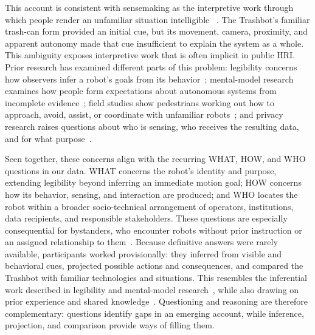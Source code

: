 This account is consistent with sensemaking as the interpretive work through
which people render an unfamiliar situation intelligible
~\cite{weick2005organizing}.  The Trashbot's familiar trash-can form provided an initial cue, but its movement, camera, proximity, and apparent autonomy made that cue insufficient to explain the system as a whole. This ambiguity exposes interpretive work that is often implicit in public HRI. Prior research has examined different parts of this problem: legibility concerns how observers infer a robot's goals from its behavior~\cite{dragan2013legibility}; mental-model research examines how people form expectations about autonomous systems from incomplete evidence~\cite{paepcke2010judging,riek2012wizard}; field studies show pedestrians working out how to approach, avoid, assist, or coordinate with unfamiliar robots~\cite{pelikan2024encountering,dobrosovestnova2022little,weinberg2023sharing}; and privacy research raises questions about who is sensing, who receives the resulting data, and for what purpose~\cite{denning2014insitu,dietrich2026bystander}.

Seen together, these concerns align with the recurring WHAT, HOW, and WHO questions in our data. WHAT concerns the robot's identity and purpose, extending legibility beyond inferring an immediate motion goal; HOW concerns how its behavior, sensing, and interaction are produced; and WHO locates the robot within a broader socio-technical arrangement of operators, institutions, data recipients, and responsible stakeholders. These questions are especially consequential for bystanders, who encounter robots without prior instruction or an assigned relationship to them~\cite{scholtz2003theory,rosenthal2020forgotten}. Because definitive answers were rarely available, participants worked provisionally: they inferred from visible and behavioral cues, projected possible actions and consequences, and compared the Trashbot with familiar technologies and situations. This resembles the inferential work described in legibility and mental-model research~\cite{dragan2013legibility,paepcke2010judging}, while also drawing on prior experience and shared knowledge~\cite{clark1996using,weick2005organizing}. Questioning and reasoning are therefore complementary: questions identify gaps in an emerging account, while inference, projection, and comparison provide ways of filling them.

